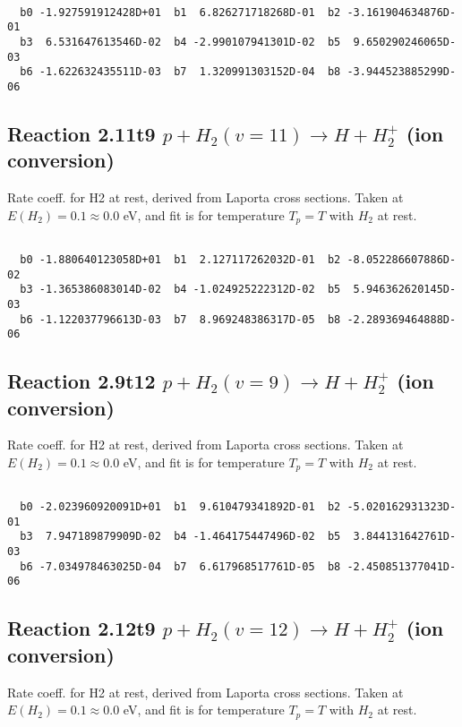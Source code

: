 \begin{small}\begin{verbatim}

  b0 -1.927591912428D+01  b1  6.826271718268D-01  b2 -3.161904634876D-01
  b3  6.531647613546D-02  b4 -2.990107941301D-02  b5  9.650290246065D-03
  b6 -1.622632435511D-03  b7  1.320991303152D-04  b8 -3.944523885299D-06

\end{verbatim}\end{small}

\newpage
\subsection{
Reaction 2.11t9
$ p + H_2(v=11) \rightarrow H + H_2^+$ (ion conversion)
}
Rate coeff. for H2 at rest, derived from Laporta cross sections.
Taken at $E(H_2) = 0.1 \approx 0.0$ eV,  and fit is for temperature $T_p=T$ with $H_2$ at rest.

\begin{small}\begin{verbatim}

  b0 -1.880640123058D+01  b1  2.127117262032D-01  b2 -8.052286607886D-02
  b3 -1.365386083014D-02  b4 -1.024925222312D-02  b5  5.946362620145D-03
  b6 -1.122037796613D-03  b7  8.969248386317D-05  b8 -2.289369464888D-06

\end{verbatim}\end{small}

\newpage
\subsection{
Reaction 2.9t12
$ p + H_2(v=9) \rightarrow H + H_2^+$ (ion conversion)
}
Rate coeff. for H2 at rest, derived from Laporta cross sections.
Taken at $E(H_2) = 0.1 \approx 0.0$ eV,  and fit is for temperature $T_p=T$ with $H_2$ at rest.

\begin{small}\begin{verbatim}

  b0 -2.023960920091D+01  b1  9.610479341892D-01  b2 -5.020162931323D-01
  b3  7.947189879909D-02  b4 -1.464175447496D-02  b5  3.844131642761D-03
  b6 -7.034978463025D-04  b7  6.617968517761D-05  b8 -2.450851377041D-06

\end{verbatim}\end{small}

\newpage
\subsection{
Reaction 2.12t9
$ p + H_2(v=12) \rightarrow H + H_2^+$ (ion conversion)
}
Rate coeff. for H2 at rest, derived from Laporta cross sections.
Taken at $E(H_2) = 0.1 \approx 0.0$ eV,  and fit is for temperature $T_p=T$ with $H_2$ at rest.

